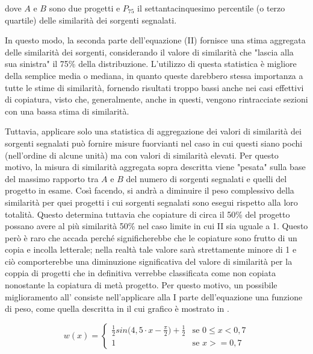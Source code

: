 dove $A$ e $B$ sono due progetti e $P_{75}$ il settantacinquesimo percentile (o terzo quartile) delle similarità dei sorgenti segnalati.

In questo modo, la seconda parte dell'equazione (II) fornisce una stima aggregata delle similarità dei sorgenti, considerando il valore di similarità che "lascia alla sua sinistra" il 75\% della distribuzione.
%
L'utilizzo di questa statistica è migliore della semplice media o mediana, in quanto queste darebbero stessa importanza a tutte le stime di similarità, fornendo risultati troppo bassi anche nei casi effettivi di copiatura, visto che, generalmente, anche in questi, vengono rintracciate sezioni con una bassa stima di similarità.

Tuttavia, applicare solo una statistica di aggregazione dei valori di similarità dei sorgenti segnalati può fornire misure fuorvianti nel caso in cui questi siano pochi (nell'ordine di alcune unità) ma con valori di similarità elevati.
%
Per questo motivo, la misura di similarità aggregata sopra descritta viene "pesata" sulla base del massimo rapporto tra $A$ e $B$ del numero di sorgenti segnalati e quelli del progetto in esame.
%
Così facendo, si andrà a diminuire il peso complessivo della similarità per quei progetti i cui sorgenti segnalati sono esegui rispetto alla loro totalità.
%
Questo determina tuttavia che copiature di circa il 50\% del progetto possano avere al più similarità 50\% nel caso limite in cui II sia uguale a 1.
%
Questo però è raro che accada perché significherebbe che le copiature sono frutto di un copia e incolla letterale; nella realtà tale valore sarà strettamente minore di 1 e ciò comporterebbe una diminuzione significativa del valore di similarità per la coppia di progetti che in definitiva verrebbe classificata come non copiata nonostante la copiatura di metà progetto.
%
Per questo motivo, un possibile miglioramento all' consiste nell'applicare alla I parte dell'equazione una funzione di peso, come quella descritta in  il cui grafico è mostrato in .

\begin{equation}
	w(x) = 
		\begin{cases}
			\frac{1}{2} sin\bigl( 4,5 \cdot x - \frac{\pi}{2} \bigr) + \frac{1}{2} & \text{se $0 \leq x < 0,7$} \\
			1 & \text{se $x >= 0,7$}
		\end{cases}	
	\label{eq:weight-function}	
\end{equation}

